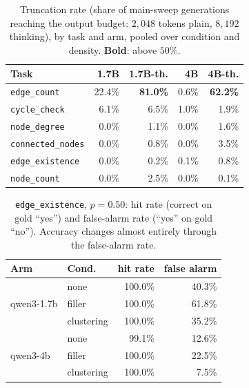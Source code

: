 \documentclass[11pt]{article}
\begin{document}
\begin{table}[H]
\centering
\footnotesize
\setlength{\tabcolsep}{3pt}
\begin{tabular}{lrrrr}
\toprule
Task & 1.7B & 1.7B-th. & 4B & 4B-th. \\
\midrule
\texttt{edge\_count}     & 22.4\% & \textbf{81.0\%} & 0.6\% & \textbf{62.2\%} \\
\texttt{cycle\_check}    & 6.1\%  & 6.5\%  & 1.0\%  & 1.9\% \\
\texttt{node\_degree}    & 0.0\%  & 1.1\%  & 0.0\%  & 1.6\% \\
\texttt{connected\_nodes}& 0.0\%  & 0.8\%  & 0.0\%  & 3.5\% \\
\texttt{edge\_existence} & 0.0\%  & 0.2\%  & 0.1\%  & 0.8\% \\
\texttt{node\_count}     & 0.0\%  & 2.5\%  & 0.0\%  & 0.1\% \\
\bottomrule
\end{tabular}
\caption{Truncation rate (share of main-sweep generations reaching the
output budget: $2{,}048$ tokens plain, $8{,}192$ thinking), by task and
arm, pooled over condition and density. \textbf{Bold}: above $50\%$.}
\label{tab:hitcap}
\end{table}

\begin{table}[H]
\centering
\small
\setlength{\tabcolsep}{3pt}
\begin{tabular}{llrr}
\toprule
Arm & Cond. & hit rate & false alarm \\
\midrule
\multirow{3}{*}{qwen3-1.7b} & none       & 100.0\% & 40.3\% \\
                            & filler     & 100.0\% & 61.8\% \\
                            & clustering & 100.0\% & 35.2\% \\
\midrule
\multirow{3}{*}{qwen3-4b}   & none       & 99.1\%  & 12.6\% \\
                            & filler     & 100.0\% & 22.5\% \\
                            & clustering & 100.0\% & 7.5\% \\
\bottomrule
\end{tabular}
\caption{\texttt{edge\_existence}, $p{=}0.50$: hit rate (correct on gold
``yes'') and false-alarm rate (``yes'' on gold ``no''). Accuracy changes
almost entirely through the false-alarm rate.}
\label{tab:booleanbias}
\end{table}
\end{document}
